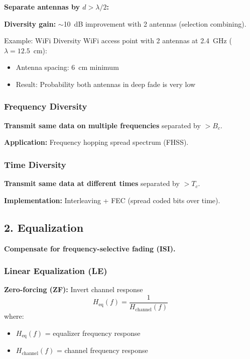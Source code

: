 \textbf{Separate antennas by $d > \lambda/2$:}

\textbf{Diversity gain:} $\sim$10~dB improvement with 2 antennas (selection combining).

\begin{calloutbox}{Example: WiFi Diversity}
WiFi access point with 2 antennas at 2.4~GHz ($\lambda = 12.5$~cm):
\begin{itemize}
\item Antenna spacing: 6~cm minimum
\item Result: Probability both antennas in deep fade is very low
\end{itemize}
\end{calloutbox}

\subsubsection{Frequency Diversity}

\textbf{Transmit same data on multiple frequencies} separated by $> B_c$.

\textbf{Application:} Frequency hopping spread spectrum (FHSS).

\subsubsection{Time Diversity}

\textbf{Transmit same data at different times} separated by $> T_c$.

\textbf{Implementation:} Interleaving + FEC (spread coded bits over time).

\subsection{2. Equalization}

\textbf{Compensate for frequency-selective fading (ISI).}

\subsubsection{Linear Equalization (LE)}

\textbf{Zero-forcing (ZF):} Invert channel response
\begin{equation}
H_{\text{eq}}(f) = \frac{1}{H_{\text{channel}}(f)}
\label{eq:zero-forcing}
\end{equation}
where:
\begin{itemize}
\item $H_{\text{eq}}(f)$ = equalizer frequency response
\item $H_{\text{channel}}(f)$ = channel frequency response
\end{itemize}

